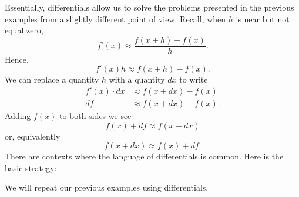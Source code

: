 \documentclass{ximera}
\begin{document}
Essentially, differentials allow us to solve the problems presented in
the previous examples from a slightly different point of view. Recall,
when $h$ is near but not equal zero,
\[
f'(x) \approx \frac{f(x+h)-f(x)}{h}.
\]
Hence, 
\[
f'(x)h \approx f(x+h)-f(x).
\]
We can replace a quantity $h$ with a quantity $dx$ to write
\begin{align*}
f'(x)\cdot dx &\approx f(x+dx)-f(x)\\
df &\approx f(x+dx)-f(x).
\end{align*}
Adding $f(x)$ to both sides we see
\[
f(x) + df\approx f(x+dx)
\]
or, equivalently
\[
f(x+dx)\approx f(x) + df .
\]
There
are contexts where the language of differentials is common. Here is
the basic strategy:
\begin{image}
\end{image}

We will repeat our previous examples using differentials.
\end{document}
